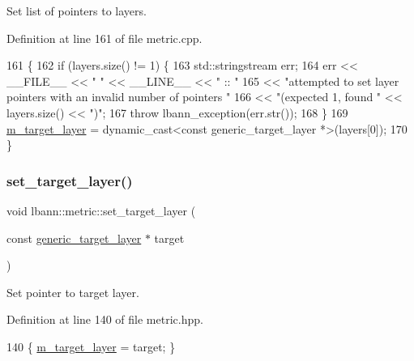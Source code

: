 Set list of pointers to layers. 

Definition at line 161 of file metric.\+cpp.


\begin{DoxyCode}
161                                                         \{
162   \textcolor{keywordflow}{if} (layers.size() != 1) \{
163     std::stringstream err;
164     err << \_\_FILE\_\_ << \textcolor{stringliteral}{" "} << \_\_LINE\_\_ << \textcolor{stringliteral}{" :: "}
165         << \textcolor{stringliteral}{"attempted to set layer pointers with an invalid number of pointers "}
166         << \textcolor{stringliteral}{"(expected 1, found "} << layers.size() << \textcolor{stringliteral}{")"};
167     \textcolor{keywordflow}{throw} lbann\_exception(err.str());
168   \}
169   \hyperlink{classlbann_1_1metric_a2bf6c53efb1b525bfa63a8c3167968d9}{m\_target\_layer} = \textcolor{keyword}{dynamic\_cast<}\textcolor{keyword}{const }generic\_target\_layer *\textcolor{keyword}{>}(layers[0]);
170 \}
\end{DoxyCode}
\mbox{\label{classlbann_1_1metric_a8367719e2c7816a4c718c049ea97b709}} 
\subsubsection{\texorpdfstring{set\+\_\+target\+\_\+layer()}{set\_target\_layer()}}
{\footnotesize\ttfamily void lbann\+::metric\+::set\+\_\+target\+\_\+layer (\begin{DoxyParamCaption}\item[{const \hyperlink{classlbann_1_1generic__target__layer}{generic\+\_\+target\+\_\+layer} $\ast$}]{target }\end{DoxyParamCaption})\hspace{0.3cm}{\ttfamily [inline]}}

Set pointer to target layer. 

Definition at line 140 of file metric.\+hpp.


\begin{DoxyCode}
140 \{ \hyperlink{classlbann_1_1metric_a2bf6c53efb1b525bfa63a8c3167968d9}{m\_target\_layer} = target; \}
\end{DoxyCode}
\mbox{\label{classlbann_1_1metric_a898d23e410297378db2fe9f8d1754fe0}} 
